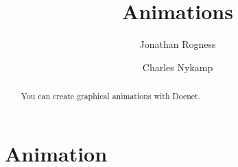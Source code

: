 \documentclass{ximera}
\title{Animations}
\author{Jonathan Rogness \and Charles Nykamp}
\begin{document}
\begin{abstract}
  You can create graphical animations with Doenet.
\end{abstract}
\maketitle
\label{xim:doenetDemo}

\section{Animation}

\end{document}
